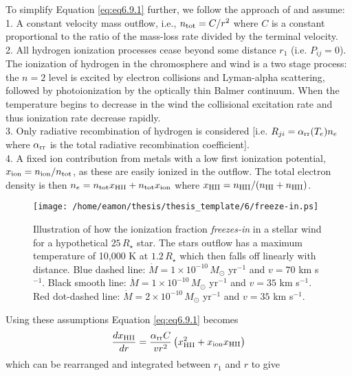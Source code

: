 To simplify Equation \ref{eq:eq6.9.1} further, we follow the approach of \cite{glassgold_1986} and assume:\\
1. A constant velocity mass outflow, i.e., $n_{\rm{tot}}=C/r^2$ where $C$ is a constant proportional to the ratio of the mass-loss rate divided by the terminal velocity.\\
2. All hydrogen ionization processes cease beyond some distance $r_{1}$ (i.e. $P_{ij}=0$). The ionization of hydrogen in the chromosphere and wind is a two stage process: the $n = 2$ level is excited by electron collisions and Lyman-alpha scattering, followed by photoionization by the optically thin Balmer continuum. When the temperature begins to decrease in the wind the collisional excitation rate and thus ionization rate decrease rapidly.\\
3. Only radiative recombination of hydrogen is considered [i.e. $R_{ji}=\alpha _{\rm{rr}}(T_e)n_e$ where $\alpha _{\rm{rr}}$ is the total radiative recombination coefficient].\\
4. A fixed ion contribution from metals with a low first ionization potential, $x_{\rm{ion}}=n_{\rm{ion}}/n_{\rm{tot}}$, as these are easily ionized in the outflow. The total electron density is then $n_e=n_{\rm{tot}}x_{\rm{HII}} + n_{\rm{tot}}x_{\rm{ion}}$ where  $x_{\rm{HII}}=n_{\rm{HII}}/(n_{\rm{HI}}+n_{\rm{HII}})$.\\
\begin{figure}[hb!]
\centering 
          \texttt{[image: /home/eamon/thesis/thesis\_template/6/freeze-in.ps]}
\caption[Illustration of how the ionization fraction \textit{freezes-in}]{Illustration of how the ionization fraction \textit{freezes-in} in a stellar wind for a hypothetical $25\,R_{\star}$ star. The stars outflow has a maximum temperature of 10,000 K at $1.2\,R_{\star}$ which then falls off linearly with distance. Blue dashed line: $\dot{M} = 1 \times 10^{-10}\,M_{\odot}$ yr$^{-1}$ and $v=70$ km s$^{-1}$. Black smooth line: $\dot{M} = 1 \times 10^{-10}\,M_{\odot}$ yr$^{-1}$ and $v=35$ km s$^{-1}$. Red dot-dashed line: $\dot{M} = 2 \times 10^{-10}\,M_{\odot}$ yr$^{-1}$ and $v=35$ km s$^{-1}$. }
\label{fig6.8}
\end{figure}
Using these assumptions Equation \ref{eq:eq6.9.1} becomes
\begin{equation}
\frac{dx_{\rm{HII}}}{dr}=\frac{\alpha _{\rm{rr}}C}{vr^2}\left(x_{\rm{HII}}^2 +x_{\rm{ion}}x_{\rm{HII}} \right)
\end{equation}
which can be rearranged and integrated between $r_1$ and $r$ to give

